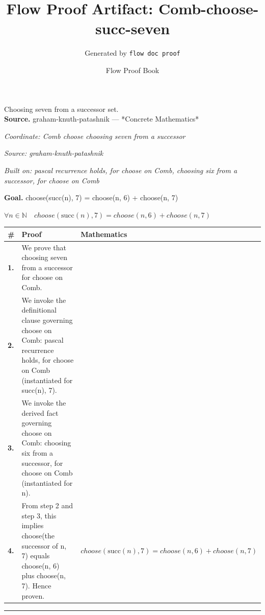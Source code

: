 \documentclass[11pt]{article}
\title{Flow Proof Artifact: Comb-choose-succ-seven}
\author{Generated by \texttt{flow doc proof}}
\date{Flow Proof Book}
\theoremstyle{definition}
\begin{document}
\maketitle
Choosing seven from a successor set.\\[0.5em]
\textbf{Source.} graham-knuth-patashnik — *Concrete Mathematics*\\[0.5em]
\bigskip
{}\par
\smallskip\noindent\textit{Coordinate: Comb \cdot choose \cdot choosing seven from a successor}\par
\smallskip\noindent\textit{Source: graham-knuth-patashnik}\par
\smallskip\noindent\textit{Built on: pascal recurrence holds, for choose on Comb, choosing six from a successor, for choose on Comb}\par
\medskip
\noindent\textbf{Goal.} choose(succ(n), 7) = choose(n, 6) + choose(n, 7)\par
\noindent$\displaystyle \forall n \in \mathbb{N}\quad choose(\mathrm{succ}(n), 7) = choose(n, 6) + choose(n, 7)$\par
\medskip
\noindent
\begin{tabular}{@{} >{\raggedright\arraybackslash}p{} >{\raggedright\arraybackslash}p{} >{\raggedleft\arraybackslash}p{} @{}}
\textbf{\#} & \textbf{Proof} & \textbf{Mathematics} \\
\midrule
\textbf{1.} & We prove that choosing seven from a successor for choose on Comb. & \\[0.45em]
\textbf{2.} & We invoke the definitional clause governing choose on Comb: pascal recurrence holds, for choose on Comb (instantiated for succ(n), 7). & \\[0.45em]
\textbf{3.} & We invoke the derived fact governing choose on Comb: choosing six from a successor, for choose on Comb (instantiated for n). & \\[0.45em]
\textbf{4.} & From step 2 and step 3, this implies choose(the successor of n, 7) equals choose(n, 6) plus choose(n, 7). Hence proven. & $\displaystyle choose(\mathrm{succ}(n), 7) = choose(n, 6) + choose(n, 7)$ \\[0.45em]
\bottomrule
\end{tabular}
\label{thm:Comb-choose-choosing_seven_from_a_successor}
\par\medskip\hrule
\end{document}
